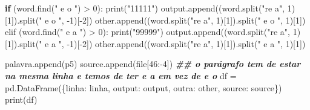 \documentclass[
  12pt,
]{article}
\newenvironment{Shaded}{\begin{snugshade}}{\end{snugshade}}
\newcommand{\ControlFlowTok}[1]{\textcolor[rgb]{0.13,0.29,0.53}{\textbf{#1}}}
\newcommand{\DecValTok}[1]{\textcolor[rgb]{0.00,0.00,0.81}{#1}}
\newcommand{\DocumentationTok}[1]{\textcolor[rgb]{0.56,0.35,0.01}{\textbf{\textit{#1}}}}
\newcommand{\FunctionTok}[1]{\textcolor[rgb]{0.00,0.00,0.00}{#1}}
\newcommand{\NormalTok}[1]{#1}
\newcommand{\OtherTok}[1]{\textcolor[rgb]{0.56,0.35,0.01}{#1}}
\newcommand{\SpecialCharTok}[1]{\textcolor[rgb]{0.00,0.00,0.00}{#1}}
\newcommand{\StringTok}[1]{\textcolor[rgb]{0.31,0.60,0.02}{#1}}
\begin{document}
\begin{Shaded}
\begin{Highlighting}[]
                            \ControlFlowTok{if}\NormalTok{ (}\FunctionTok{word.find}\NormalTok{(}\StringTok{" e o "}\NormalTok{) }\SpecialCharTok{\textgreater{}} \DecValTok{0}\NormalTok{)}\SpecialCharTok{:}
                                \FunctionTok{print}\NormalTok{(}\StringTok{"11111"}\NormalTok{)}
                                \FunctionTok{output.append}\NormalTok{((}\FunctionTok{word.split}\NormalTok{(}\StringTok{"re a"}\NormalTok{, }\DecValTok{1}\NormalTok{)[}\DecValTok{1}\NormalTok{])}\FunctionTok{.split}\NormalTok{(}\StringTok{" e o "}\NormalTok{, }\SpecialCharTok{{-}}\DecValTok{1}\NormalTok{)[}\SpecialCharTok{{-}}\DecValTok{2}\NormalTok{])}
                                \FunctionTok{other.append}\NormalTok{((}\FunctionTok{word.split}\NormalTok{(}\StringTok{"re a"}\NormalTok{, }\DecValTok{1}\NormalTok{)[}\DecValTok{1}\NormalTok{])}\FunctionTok{.split}\NormalTok{(}\StringTok{" e o "}\NormalTok{, }\DecValTok{1}\NormalTok{)[}\DecValTok{1}\NormalTok{])}
                            \FunctionTok{elif}\NormalTok{ (}\FunctionTok{word.find}\NormalTok{(}\StringTok{" e a "}\NormalTok{) }\SpecialCharTok{\textgreater{}} \DecValTok{0}\NormalTok{)}\SpecialCharTok{:}
                                \FunctionTok{print}\NormalTok{(}\StringTok{"99999"}\NormalTok{)}
                                \FunctionTok{output.append}\NormalTok{((}\FunctionTok{word.split}\NormalTok{(}\StringTok{"re a"}\NormalTok{, }\DecValTok{1}\NormalTok{)[}\DecValTok{1}\NormalTok{])}\FunctionTok{.split}\NormalTok{(}\StringTok{" e a "}\NormalTok{, }\SpecialCharTok{{-}}\DecValTok{1}\NormalTok{)[}\SpecialCharTok{{-}}\DecValTok{2}\NormalTok{])}
                                \FunctionTok{other.append}\NormalTok{((}\FunctionTok{word.split}\NormalTok{(}\StringTok{"re a"}\NormalTok{, }\DecValTok{1}\NormalTok{)[}\DecValTok{1}\NormalTok{])}\FunctionTok{.split}\NormalTok{(}\StringTok{" e a "}\NormalTok{, }\DecValTok{1}\NormalTok{)[}\DecValTok{1}\NormalTok{])}

                            \FunctionTok{palavra.append}\NormalTok{(p5)}
                            \FunctionTok{source.append}\NormalTok{(file[}\DecValTok{46}\SpecialCharTok{:{-}}\DecValTok{4}\NormalTok{])}
\DocumentationTok{\#\# o parágrafo tem de estar na mesma linha e temos de ter \textquotesingle{}e a\textquotesingle{} em vez de \textquotesingle{}e o\textquotesingle{}}
\NormalTok{df }\OtherTok{=} \FunctionTok{pd.DataFrame}\NormalTok{(\{}\StringTok{\textquotesingle{}linha\textquotesingle{}}\SpecialCharTok{:}\NormalTok{ linha, }\StringTok{\textquotesingle{}output\textquotesingle{}}\SpecialCharTok{:}\NormalTok{ output,}
                   \StringTok{\textquotesingle{}outra\textquotesingle{}}\SpecialCharTok{:}\NormalTok{ other, }\StringTok{\textquotesingle{}source\textquotesingle{}}\SpecialCharTok{:}\NormalTok{ source\})}
\FunctionTok{print}\NormalTok{(df)}


\end{Highlighting}
\end{Shaded}
\end{document}
